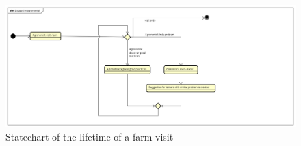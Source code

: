 \bigskip
\begin{figure}[H]
    \includegraphics[width=\textwidth,height=\textheight,keepaspectratio]{Images/agronomistVisitFarm.png}
    \caption{Statechart of the lifetime of a farm visit}
    \label{fig:statechart_agronomist_visit}
\end{figure}
